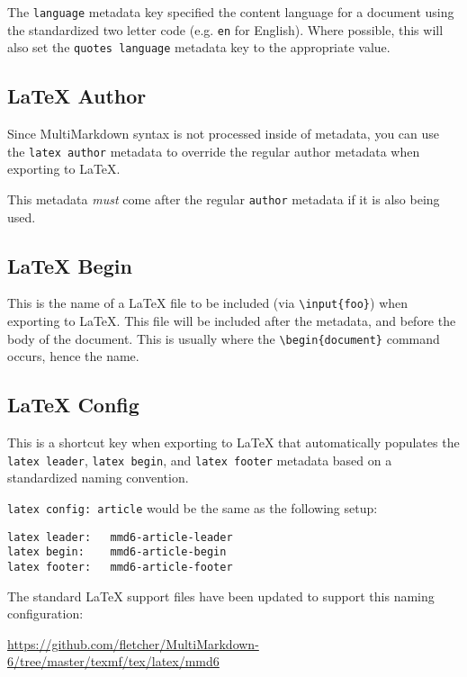 The \texttt{language} metadata key specified the content language for a document using the standardized two letter code (e.g. \texttt{en} for English). Where possible, this will also set the \texttt{quotes language} metadata key to the appropriate value.

\subsection{LaTeX Author }
\label{latexauthor}

Since MultiMarkdown syntax is not processed inside of metadata, you can use the \texttt{latex author} metadata to override the regular author metadata when exporting to LaTeX.

This metadata \emph{must} come after the regular \texttt{author} metadata if it is also being used.

\subsection{LaTeX Begin }
\label{latexbegin}

This is the name of a LaTeX file to be included (via \texttt{\textbackslash{}input\{foo\}}) when exporting to LaTeX. This file will be included after the metadata, and before the body of the document. This is usually where the \texttt{\textbackslash{}begin\{document\}} command occurs, hence the name.

\subsection{LaTeX Config }
\label{latexconfig}

This is a shortcut key when exporting to LaTeX that automatically populates the \texttt{latex leader}, \texttt{latex begin}, and \texttt{latex footer} metadata based on a standardized naming convention.

\texttt{latex config: article} would be the same as the following setup:

\begin{verbatim}
latex leader:	mmd6-article-leader
latex begin:	mmd6-article-begin
latex footer:	mmd6-article-footer
\end{verbatim}

The standard LaTeX support files have been updated to support this naming configuration:

\href{https://github.com/fletcher/MultiMarkdown-6/tree/master/texmf/tex/latex/mmd6}{https:\slash \slash github.com\slash fletcher\slash MultiMarkdown-6\slash tree\slash master\slash texmf\slash tex\slash latex\slash mmd6}

